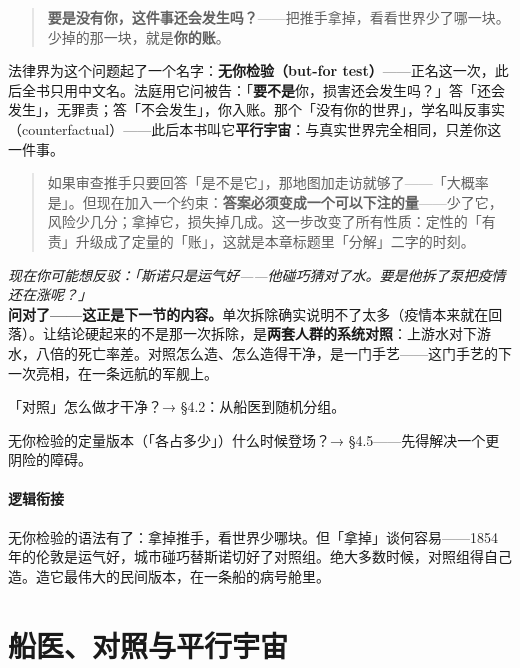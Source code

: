 \documentclass[../../main2.tex]{subfiles}
\begin{document}
	\begin{quote}
		\textbf{要是没有你，这件事还会发生吗？}——把推手拿掉，看看世界少了哪一块。少掉的那一块，就是\textbf{你的账}。
	\end{quote}

	法律界为这个问题起了一个名字：\textbf{无你检验（but-for test）}——正名这一次，此后全书只用中文名。法庭用它问被告：「\textbf{要不是}你，损害还会发生吗？」答「还会发生」，无罪责；答「不会发生」，你入账。那个「没有你的世界」，学名叫反事实（counterfactual）——此后本书叫它\textbf{平行宇宙}：与真实世界完全相同，只差你这一件事。

	\begin{quote}
		如果审查推手只要回答「是不是它」，那地图加走访就够了——「大概率是」。但现在加入一个约束：\textbf{答案必须变成一个可以下注的量}——少了它，风险少几分；拿掉它，损失掉几成。这一步改变了所有性质：定性的「有责」升级成了定量的「账」，这就是本章标题里「分解」二字的时刻。
	\end{quote}

	\begin{questionbox}
		\textit{现在你可能想反驳：「斯诺只是运气好——他碰巧猜对了水。要是他拆了泵把疫情还在涨呢？」}\\
		\textbf{问对了——这正是下一节的内容。}单次拆除确实说明不了太多（疫情本来就在回落）。让结论硬起来的不是那一次拆除，是\textbf{两套人群的系统对照}：上游水对下游水，八倍的死亡率差。对照怎么造、怎么造得干净，是一门手艺——这门手艺的下一次亮相，在一条远航的军舰上。
	\end{questionbox}

	\begin{reader_anticipation}
		\item 「对照」怎么做才干净？→ §4.2：从船医到随机分组。
		\item 无你检验的定量版本（「各占多少」）什么时候登场？→ §4.5——先得解决一个更阴险的障碍。
	\end{reader_anticipation}

	\paragraph*{逻辑衔接}
	无你检验的语法有了：拿掉推手，看世界少哪块。但「拿掉」谈何容易——1854 年的伦敦是运气好，城市碰巧替斯诺切好了对照组。绝大多数时候，对照组得自己造。造它最伟大的民间版本，在一条船的病号舱里。

	\section{船医、对照与平行宇宙}
	\label{sec:contrib-rct}
\end{document}
